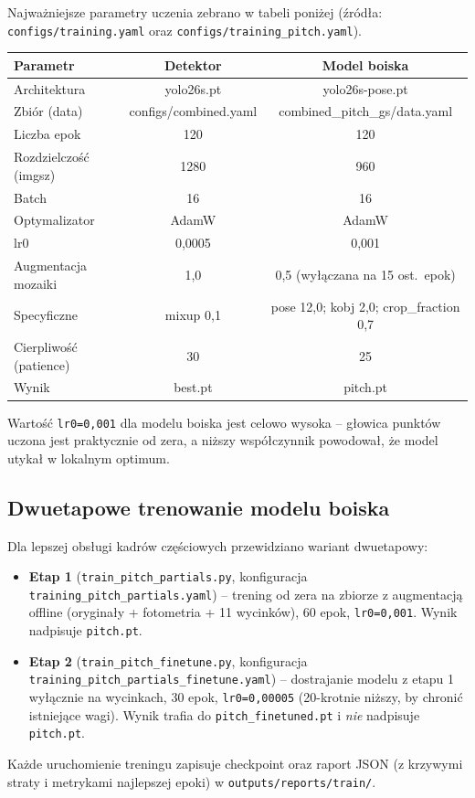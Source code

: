 \documentclass[11pt,a4paper]{article}
\begin{document}
Najważniejsze parametry uczenia zebrano w tabeli poniżej (źródła:
\texttt{configs/training.yaml} oraz \texttt{configs/training\_pitch.yaml}).

\begin{center}
\small
\begin{tabular}{l c c}
\toprule
Parametr & Detektor & Model boiska \\
\midrule
Architektura            & yolo26s.pt        & yolo26s-pose.pt \\
Zbiór (data)            & configs/combined.yaml & combined\_pitch\_gs/data.yaml \\
Liczba epok             & 120               & 120 \\
Rozdzielczość (imgsz)   & 1280              & 960 \\
Batch                   & 16                & 16 \\
Optymalizator           & AdamW             & AdamW \\
lr0                     & 0,0005            & 0,001 \\
Augmentacja mozaiki     & 1,0               & 0,5 (wyłączana na 15 ost.\ epok) \\
Specyficzne             & mixup 0,1         & pose 12,0; kobj 2,0; crop\_fraction 0,7 \\
Cierpliwość (patience)  & 30                & 25 \\
Wynik                   & best.pt           & pitch.pt \\
\bottomrule
\end{tabular}
\end{center}

Wartość \texttt{lr0=0,001} dla modelu boiska jest celowo wysoka -- głowica
punktów uczona jest praktycznie od zera, a niższy współczynnik powodował, że model utykał w lokalnym optimum.

\subsection{Dwuetapowe trenowanie modelu boiska}

Dla lepszej obsługi kadrów częściowych przewidziano wariant dwuetapowy:
\begin{itemize}[nosep]
  \item \textbf{Etap 1} (\texttt{train\_pitch\_partials.py}, konfiguracja
        \texttt{training\_pitch\_partials.yaml}) -- trening od zera na zbiorze z
        augmentacją offline (oryginały + fotometria + 11 wycinków), 60 epok,
        \texttt{lr0=0,001}. Wynik nadpisuje \texttt{pitch.pt}.
  \item \textbf{Etap 2} (\texttt{train\_pitch\_finetune.py}, konfiguracja
        \texttt{training\_pitch\_partials\_finetune.yaml}) -- dostrajanie modelu z
        etapu 1 wyłącznie na wycinkach, 30 epok, \texttt{lr0=0,00005}
        (20-krotnie niższy, by chronić istniejące wagi). Wynik trafia do
        \texttt{pitch\_finetuned.pt} i \emph{nie} nadpisuje \texttt{pitch.pt}.
\end{itemize}
Każde uruchomienie treningu zapisuje checkpoint oraz raport JSON (z krzywymi
straty i metrykami najlepszej epoki) w \texttt{outputs/reports/train/}.
\end{document}
